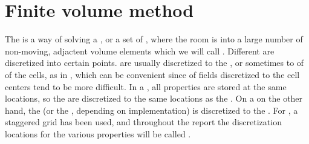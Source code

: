 \chapter{Finite volume method}






\newabbrev{\textgammapath}{\mbox{$\gammapath$}}

The \FVM is a way of solving a \PDE, or a set of \PDEs, where the room is \discretized into a large number of non-moving, adjactent volume elements which we will call \cells. Different \properties are discretized into certain points.  are usually discretized to the , or sometimes to  of  of the cells, as in \citep{Losasso2004}, which can be convenient since \interpolation of fields discretized to the cell centers tend to be more difficult. In a , all properties are stored at the same locations, so the  are discretized to the same locations as the . On a  on the other hand, the \velocity (or the \momentum, depending on implementation) is discretized to the . For \thiswork, a staggered grid has been used, and throughout the report the discretization locations for the various properties will be called .

